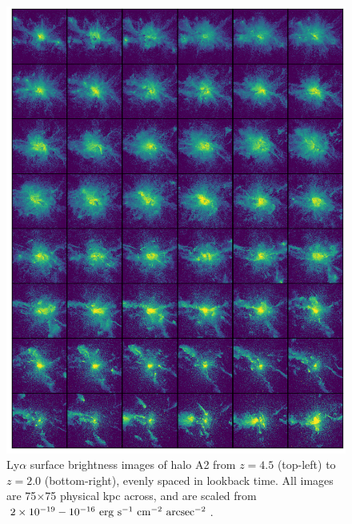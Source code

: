 \begin{figure}
    \centering
    \includegraphics[width=\textwidth,keepaspectratio]{figures/rogues_A2.png}
    \caption{
        Ly$\alpha$ surface brightness images of halo A2 from $z=4.5$ (top-left) to $z=2.0$ (bottom-right), evenly spaced in lookback time.
        All images are 75$\times$75 physical kpc across, and are scaled from $2\times 10^{-19}-10^{-16}\ \rm{erg}\ \rm{s}^{-1}\ \rm{cm}^{-2}\ \rm{arcsec}^{-2}$.
    }
  \label{fig:rogues2}
\end{figure}

